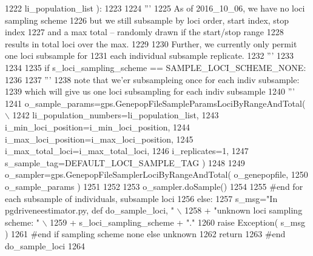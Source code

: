 \begin{DoxyCode}
1222                         li\_population\_list ):
1223         
1224     \textcolor{stringliteral}{'''}
1225 \textcolor{stringliteral}{    As of 2016\_10\_06, we have no loci sampling scheme}
1226 \textcolor{stringliteral}{    but we still subsample by loci order, start index, stop index}
1227 \textcolor{stringliteral}{    and a max total -- randomly drawn if the start/stop range}
1228 \textcolor{stringliteral}{    results in total loci over the max. }
1229 \textcolor{stringliteral}{}
1230 \textcolor{stringliteral}{    Further, we currently only permit one loci subsample for}
1231 \textcolor{stringliteral}{    each individual subsample replicate.}
1232 \textcolor{stringliteral}{    '''}
1233 
1234 
1235     \textcolor{keywordflow}{if} s\_loci\_sampling\_scheme == SAMPLE\_LOCI\_SCHEME\_NONE:
1236 
1237             \textcolor{stringliteral}{'''}
1238 \textcolor{stringliteral}{            note that we'er subsampleing once for each indiv subsample:}
1239 \textcolor{stringliteral}{            which will give us one loci subsampling for each indiv subsample}
1240 \textcolor{stringliteral}{            '''}
1241             o\_sample\_params=gps.GenepopFileSampleParamsLociByRangeAndTotal( \(\backslash\)
1242                                     li\_population\_numbers=li\_population\_list,
1243                                     i\_min\_loci\_position=i\_min\_loci\_position,
1244                                     i\_max\_loci\_position=i\_max\_loci\_position,
1245                                     i\_max\_total\_loci=i\_max\_total\_loci,
1246                                     i\_replicates=1,
1247                                     s\_sample\_tag=DEFAULT\_LOCI\_SAMPLE\_TAG )
1248 
1249             o\_sampler=gps.GenepopFileSamplerLociByRangeAndTotal( o\_genepopfile,
1250                         o\_sample\_params )
1251 
1252             
1253             o\_sampler.doSample()
1254                                                     
1255         \textcolor{comment}{#end for each subsample of individuals, subsample loci}
1256     \textcolor{keywordflow}{else}:
1257         s\_msg=\textcolor{stringliteral}{"In pgdriveneestimator.py, def do\_sample\_loci, "} \(\backslash\)
1258                     + \textcolor{stringliteral}{"unknown loci sampling scheme: "} \(\backslash\)
1259                     + s\_loci\_sampling\_scheme + \textcolor{stringliteral}{"."}
1260         \textcolor{keywordflow}{raise} Exception( s\_msg )
1261     \textcolor{comment}{#end if sampling scheme none else unknown}
1262     \textcolor{keywordflow}{return}
1263 \textcolor{comment}{#end do\_sample\_loci}
1264 
\end{DoxyCode}
